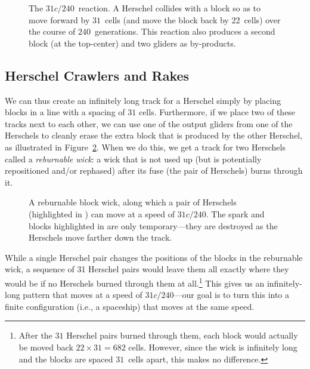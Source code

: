 \begin{figure}[!htb]
	\centering{}
	\caption{The $31c/240$~reaction. A Herschel collides with a block so as to move forward by $31$~cells (and move the block back by $22$~cells) over the course of $240$~generations. This reaction also produces a second block (at the top-center) and two gliders as by-products.}\label{fig:31c_240_reaction}
\end{figure}


\subsection{Herschel Crawlers and Rakes}\label{sec:silverfish_herschel_crawler}

We can thus create an infinitely long track for a Herschel simply by placing blocks in a line with a spacing of $31$ cells. Furthermore, if we place two of these tracks next to each other, we can use one of the output gliders from one of the Herschels to cleanly erase the extra block that is produced by the other Herschel, as illustrated in Figure~\ref{fig:31c_240_herschel_pair}. When we do this, we get a track for two Herschels called a \emph{reburnable wick}: a wick that is not used up (but is potentially repositioned and/or rephased) after its fuse (the pair of Herschels) burns through it.

\begin{figure}[!htb]
	\centering
	\caption{A reburnable block wick, along which a pair of Herschels (highlighted in ) can move at a speed of $31c/240$. The spark and blocks highlighted in  are only temporary---they are destroyed as the Herschels move farther down the track.}\label{fig:31c_240_herschel_pair}
\end{figure}

While a single Herschel pair changes the positions of the blocks in the reburnable wick, a sequence of 31 Herschel pairs would leave them all exactly where they would be if no Herschels burned through them at all.\footnote{After the $31$ Herschel pairs burned through them, each block would actually be moved back $22 \times 31 = 682$ cells. However, since the wick is infinitely long and the blocks are spaced $31$~cells apart, this makes no difference.} This gives us an infinitely-long pattern that moves at a speed of $31c/240$---our goal is to turn this into a finite configuration (i.e., a spaceship) that moves at the same speed.

